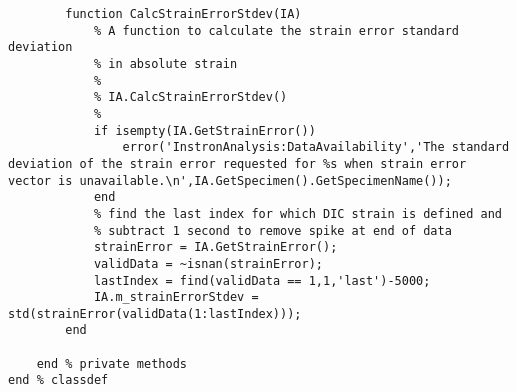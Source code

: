 \begin{lstlisting}
        function CalcStrainErrorStdev(IA)
            % A function to calculate the strain error standard deviation
            % in absolute strain
            %
            % IA.CalcStrainErrorStdev()
            %
            if isempty(IA.GetStrainError())
                error('InstronAnalysis:DataAvailability','The standard deviation of the strain error requested for %s when strain error vector is unavailable.\n',IA.GetSpecimen().GetSpecimenName());
            end
            % find the last index for which DIC strain is defined and
            % subtract 1 second to remove spike at end of data
            strainError = IA.GetStrainError();
            validData = ~isnan(strainError);
            lastIndex = find(validData == 1,1,'last')-5000;                        
            IA.m_strainErrorStdev = std(strainError(validData(1:lastIndex)));
        end
    
    end % private methods
end % classdef
\end{lstlisting}
